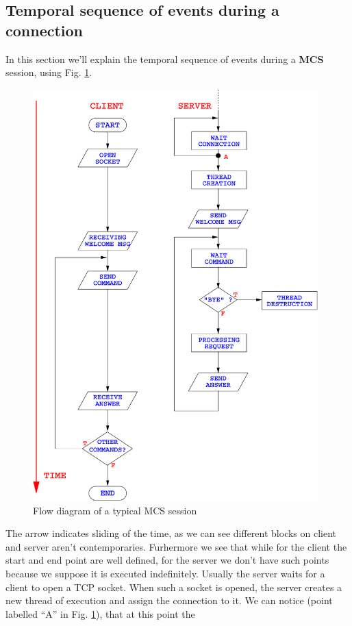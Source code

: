 \documentclass[12pt,titlepage]{book}
\newcommand{\mcs}{\textbf{MCS} }
\begin{document}
\subsection{Temporal sequence of events during a connection}
In this section we'll explain the temporal sequence of events during a
\mcs session, using Fig. \ref{flow}.
%
\begin{figure}[hbtp]
\begin{center}
\includegraphics[width=11cm,keepaspectratio]{includes/flow}
\end{center}
\caption{Flow diagram of a typical MCS session}
\label{flow}
\end{figure}
%
The arrow indicates sliding of the time, as we can see different
blocks on client and server aren't contemporaries. Furhermore we see
that while for the client the start and end point are well defined,
for the server we don't have such points because we suppose it is
executed indefinitely. Usually the server waits for a client to open a
TCP socket. When such a socket is opened, the server creates a new
thread of execution and assign the connection to it. We can notice
(point labelled ``A'' in Fig. \ref{flow}), that at this point the
\end{document}
